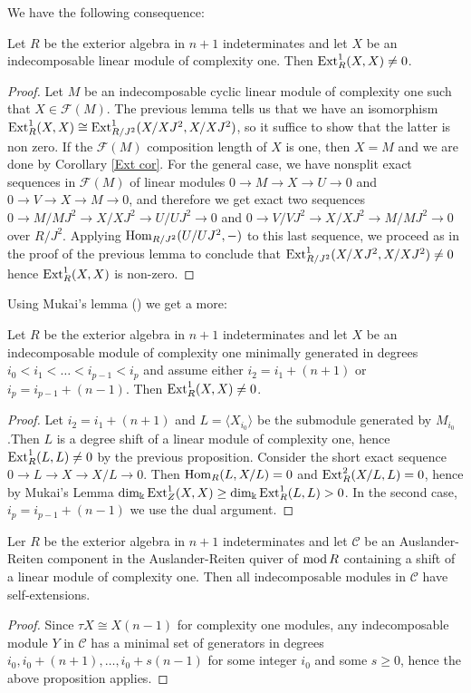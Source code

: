 \documentclass[10pt]{amsart}
\begin{document}
\noindent We have the following consequence:

\begin{prop} \label{linself} Let $R$ be the exterior algebra in $n+1$ indeterminates
and let $X$ be an indecomposable linear module of complexity one. Then $\operatorname{Ext}\nolimits^1_R(X,X)\ne 0$.
\end{prop}
\begin{proof}  Let $M$ be an indecomposable cyclic linear module  of complexity one such that $X\in\mathcal F(M)$. The previous lemma tells us that we have an isomorphism $\operatorname{Ext}\nolimits^1_R(X,X)\cong\operatorname{Ext}\nolimits^1_{{R/J^2}}(X/{XJ^2},X/{XJ^2})$, so it suffice to show that the latter is non zero. If the $\mathcal F(M)$ composition length of $X$ is one, then $X=M$ and we are done by Corollary \ref{Ext cor}. For the general case, we have nonsplit exact sequences in $\mathcal F(M)$  of linear modules $0\to M\to X\to U\to 0$ and $0\to V\to X\to M\to 0$, and therefore we get exact two sequences 
$0\to M/{MJ^2}\to X/{XJ^2}\to U/{UJ^2}\to 0$ and $0\to V/{VJ^2}\to X/{XJ^2}\to M/{MJ^2}\to 0$ over $R/{J^2}$.  Applying $\operatorname{Hom}_{R/{J^2}}(U/{UJ^2},-)$ to this last sequence, we proceed as in the proof of the previous lemma to conclude that $\operatorname{Ext}\nolimits^1_{R/{J^2}}(X/{XJ^2},X/{XJ^2})\ne 0$ hence $\operatorname{Ext}\nolimits^1_R(X,X)$ is non-zero. \end{proof}

\noindent Using Mukai's lemma (\cite[1.4]{Ru}) we  get a  more:

\begin{prop} \label {selfex}Let $R$ be the exterior algebra in $n+1$ indeterminates
and let $X$ be an indecomposable  module of complexity one minimally generated in degrees $i_0<i_1<\ldots 
<i_{p-1}<i_p$ and assume either $i_2 = i_1+(n+1)$ or $ i_p = i_{p-1}+(n-1)$. 
Then $\operatorname{Ext}\nolimits^1_R(X,X)\ne 0$.
\end{prop}
\begin{proof}  Let $i_2 = i_1+(n+1)$ and $L= \langle X_{i_0}\rangle$ be the submodule generated by $M_{i_0}$.Then $L$ is a degree shift
of a linear module of complexity one, hence $\operatorname{Ext}\nolimits_R^1(L,L) \neq 0$ by the previous proposition.
Consider the short exact sequence $0\to L \to X \to X/L \to 0$. Then $\operatorname{Hom}_R(L,X/L)=0$ and
$\operatorname{Ext}\nolimits_R^2(X/L,L)=0$, hence by Mukai's Lemma $\operatorname{dim}\nolimits_{\Bbbk}\operatorname{Ext}\nolimits_Z^1 (X,X)\geq\operatorname{dim}\nolimits_{\Bbbk} \operatorname{Ext}\nolimits_R^1(L,L)>0$.
In the second case, $ i_p = i_{p-1}+(n-1)$ we use the dual argument.
\end{proof}

\begin{cor}  Ler $R$ be the exterior algebra in $n+1$ indeterminates and let $\mathcal C$ be an Auslander-Reiten
component in the Auslander-Reiten quiver of $\operatorname{mod} R$ containing a shift of a linear module of complexity one.
Then all indecomposable modules in $\mathcal C$ have self-extensions.
\end{cor}
\begin{proof} Since $\tau X \cong X(n-1)$ for complexity one modules, any indecomposable module $Y$ in $\mathcal C$
has a minimal set of generators in degrees $i_0, i_0+(n+1), \ldots, i_0 + s(n-1)$ for some integer
$i_0$ and some $s\geq 0$, hence the above proposition applies.
\end{proof}
\end{document}

